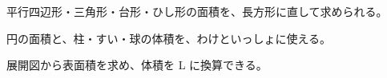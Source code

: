 \begin{furikaeri}
\begin{checklist}
\item 平行四辺形・三角形・台形・ひし形の面積を、長方形に直して求められる。
\item 円の面積と、柱・すい・球の体積を、わけといっしょに使える。
\item 展開図から表面積を求め、体積を L に換算できる。
\end{checklist}
\end{furikaeri}

